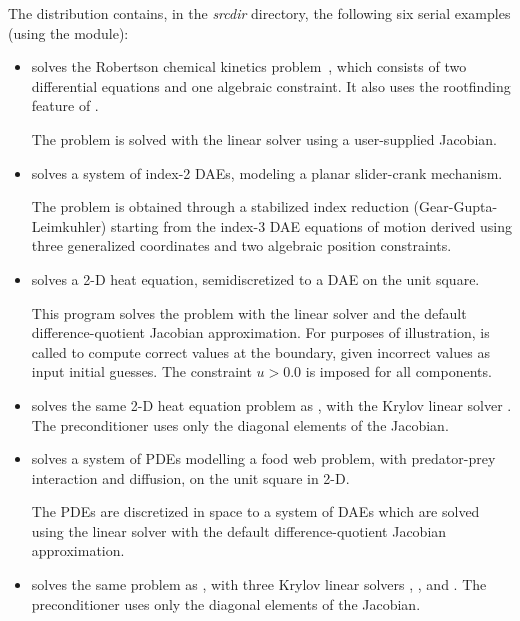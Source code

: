 \vspace{0.2in}\noindent
The {\ida} distribution contains, in the {\em srcdir}
directory, the following six serial examples (using the {\nvecs} module):
\begin{itemize}

\item {}
  solves the Robertson chemical kinetics problem~\cite{Rob:66}, which consists
  of two differential equations and one algebraic constraint.  It also uses
  the rootfinding feature of {\ida}.

  The problem is solved with the {\idadense} linear solver using
  a user-supplied Jacobian.

\item {}
  solves a system of index-2 DAEs, modeling a planar slider-crank mechanism.

  The problem is obtained through a stabilized index reduction (Gear-Gupta-Leimkuhler)
  starting from the index-3 DAE equations of motion derived using three generalized
  coordinates and two algebraic position constraints.

\item {}
  solves a 2-D heat equation, semidiscretized to a DAE on the unit square.

  This program solves the problem with the {\idaband} linear solver and
  the default difference-quotient Jacobian approximation. For purposes of
  illustration,  is called to compute correct values at the
  boundary, given incorrect values as input initial guesses. The constraint
  $u > 0.0$ is imposed for all components.

\item {}
  solves the same 2-D heat equation problem as , with the Krylov
  linear solver {\idaspgmr}. The preconditioner uses only the diagonal elements
  of the Jacobian.

\item {}
  solves a system of PDEs modelling a food web problem, with predator-prey
  interaction and diffusion, on the unit square in 2-D.

  The PDEs are discretized in space to a system of DAEs which are solved
  using the {\idaband} linear solver with the default difference-quotient 
  Jacobian approximation.

\item {}
  solves the same problem as , with three Krylov linear solvers
  {\idaspgmr}, {\idaspbcg}, and {\idasptfqmr}.  The preconditioner uses only
  the diagonal elements of the Jacobian.

\end{itemize}

